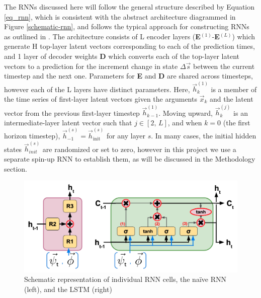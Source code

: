 The RNNs discussed here will follow the general structure described by Equation \ref{eq_rnn}, which is consistent with the abstract architecture diagrammed in Figure \ref{schematic-rnn}, and follows the typical approach for constructing RNNs as outlined in \citep{russell_artificial_2020}. The architecture consists of L encoder layers (\textbf{E}$^{(1)}$-\textbf{E}$^{(L)}$) which generate H top-layer latent vectors corresponding to each of the prediction times, and 1 layer of decoder weights \textbf{D} which converts each of the top-layer latent vectors to a prediction for the increment change in state $\Delta \vec{s}$ between the current timestep and the next one. Parameters for \textbf{E} and \textbf{D} are shared across timesteps, however each of the L layers have distinct parameters. Here, $\vec{h}_k^{(1)}$ is a member of the time series of first-layer latent vectors given the arguments $\vec{x}_k$ and the latent vector from the previous first-layer timestep $\vec{h}_{k-1}^{(1)}$. Moving upward, $\vec{h}_k^{(j)}$ is an intermediate-layer latent vector such that $j \in [2,\,L]$, and when $k=0$ (the first horizon timestep), $\vec{h}^{(s)}_{-1} = \vec{h}^{(s)}_{\text{init}}$ for any layer $s$. In many cases, the initial hidden states $\vec{h}^{(s)}_{init}$ are randomized or set to zero, however in this project we use a separate spin-up RNN to establish them, as will be discussed in the Methodology section.

\begin{figure}[h!]
    \centering

    \includegraphics[width=.95\linewidth]{figures/schematic_rnns-both.png}

    \caption{Schematic representation of individual RNN cells, the na\"ive RNN (left), and the LSTM (right)}
    \label{rnns-both}
\end{figure}

